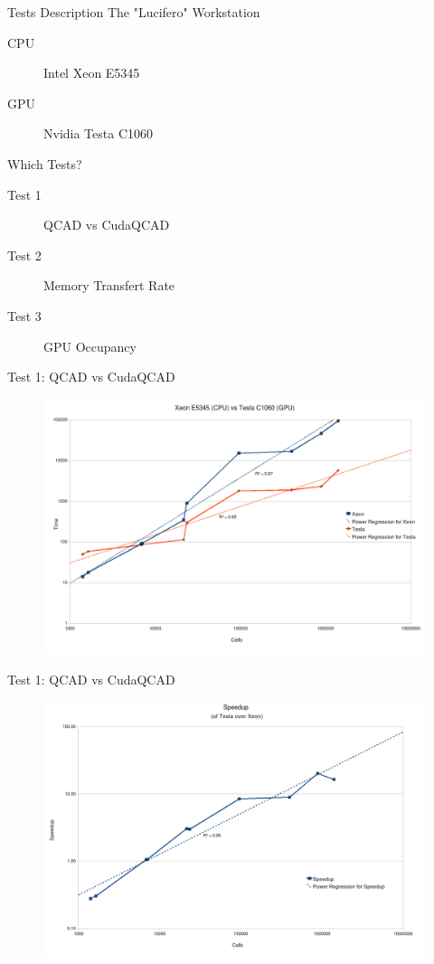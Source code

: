 \documentclass[10pt, red]{beamer}
\begin{document}
	\begin{frame}{Tests Description}
		The "Lucifero" Workstation
		\begin{description}
			\item[CPU] Intel Xeon E5345
			\item[GPU] Nvidia Testa C1060
		\end{description}
		Which Tests?
		\begin{description}
			\item[Test 1] QCAD vs CudaQCAD
			\item[Test 2] Memory Transfert Rate
			\item[Test 3] GPU Occupancy
		\end{description}
	\end{frame}

	\begin{frame}{Test 1: QCAD vs CudaQCAD}
	 	\begin{figure}
			\centering
			\includegraphics[width=\textwidth]{img/xeonvstesla}
	 	\end{figure} 
	\end{frame}

	\begin{frame}{Test 1: QCAD vs CudaQCAD}
	 	\begin{figure}
			\centering
			\includegraphics[width=\textwidth]{img/speedup}
	 	\end{figure} 
	\end{frame}
\end{document}
